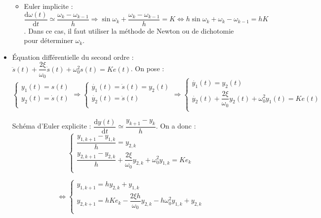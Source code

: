 \begin{itemize}[label=,font=\color{ocre}]
\begin{itemize}
\item Euler implicite : $\dfrac{\text{d} \omega(t)}{\text{d}t}\simeq \dfrac{\omega_{k}-\omega_{k-1}}{h} \Rightarrow \sin \omega_k +  \dfrac{\omega_{k}-\omega_{k-1}}{h}=K \Leftrightarrow h\sin \omega_k +  \omega_{k}-\omega_{k-1}=hK$. Dans ce cas, il faut utiliser la méthode de Newton ou de dichotomie pour déterminer $\omega_k$.
\end{itemize}
\item Équation différentielle du second ordre : $\ddot{s}(t) + \dfrac{2\xi}{\omega_0} \dot{s}(t) + \omega_0^2 s(t) = Ke(t)$.
On pose : 
$$
\left\{
\begin{array}{l}
y_1(t) = s(t) \\
y_2(t) = \dot{s}(t) \\
\end{array}
\right. 
\Rightarrow 
\left\{
\begin{array}{l}
\dot{y_1}(t) = \dot{s}(t) = y_2(t) \\
\dot{y_2}(t) = \ddot{s}(t) \\
\end{array}
\right.
\Rightarrow 
\left\{
\begin{array}{l}
\dot{y_1}(t) = y_2(t) \\
\dot{y_2}(t) + \dfrac{2\xi}{\omega_0} y_2(t)+ \omega_0^2 y_1(t) = Ke(t) \\
\end{array}
\right.
$$

\footnotesize{
\begin{multicols}{2}
Schéma d'Euler explicite :   $\dfrac{\text{d} y(t)}{\text{d}t}\simeq \dfrac{y_{k+1}-y_k}{h}$. On a donc :
$$
\left\{
\begin{array}{l}
\dfrac{y_{1,k+1}-y_{1,k}}{h} = y_{2,k} \\
\dfrac{y_{2,k+1}-y_{2,k}}{h} + \dfrac{2\xi}{\omega_0} y_{2,k}+ \omega_0^2 y_{1,k} = Ke_k \\
\end{array}
\right.
$$ 

$$\Leftrightarrow 
\left\{
\begin{array}{l}
y_{1,k+1} = h y_{2,k} +y_{1,k} \\
y_{2,k+1}  = hKe_k - \dfrac{2\xi h}{\omega_0} y_{2,k}- h\omega_0^2 y_{1,k} + y_{2,k}\\
\end{array}
\right.
$$ 



\end{multicols}}
\end{itemize}
